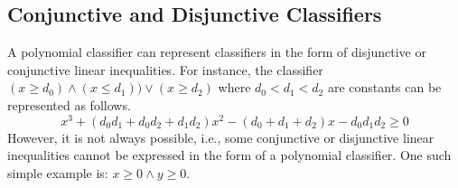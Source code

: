 
\subsection{Conjunctive and Disjunctive Classifiers}
A polynomial classifier can represent classifiers in the form of disjunctive or conjunctive linear inequalities. For instance, the classifier $(x \ge d_0) \wedge (x \le d_1)\big) \vee (x \ge d_2)$
where $d_0 < d_1 < d_2$ are constants can be represented as follows.
\[
x^3 + (d_0d_1 + d_0d_2 + d_1d_2)x^2 - (d_0 + d_1 + d_2)x - d_0d_1d_2 \geq 0
\]
However, it is not always possible, i.e., some conjunctive or disjunctive linear inequalities cannot be expressed in the form of a polynomial classifier. One such simple example is: $x \ge 0 \land y \ge 0$. 

